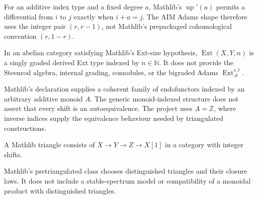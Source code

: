 \begin{definition}
  \label{def:mathlib-complex-shape-up}
  \mathlibok
  For an additive index type and a fixed degree $a$, Mathlib's
  $\operatorname{up}'(a)$ permits a differential from $i$ to $j$ exactly when
  $i+a=j$.  The AIM Adams shape therefore uses the integer pair
  $(r,r-1)$, not Mathlib's prepackaged cohomological convention $(r,1-r)$.
\end{definition}

\begin{definition}
  \label{def:mathlib-derived-ext}
  \mathlibok
  In an abelian category satisfying Mathlib's Ext-size hypothesis,
  $\operatorname{Ext}(X,Y,n)$ is a singly graded derived Ext type indexed by
  $n\in\mathbb N$.  It does not provide the Steenrod algebra, internal grading,
  comodules, or the bigraded Adams $\operatorname{Ext}_{\mathcal A}^{s,t}$.
\end{definition}

\begin{definition}
  \label{def:mathlib-shift}
  \mathlibok
  Mathlib's declaration supplies a coherent family of endofunctors indexed by
  an arbitrary additive monoid $A$.  The generic monoid-indexed structure does
  not assert that every shift is an autoequivalence.  The project uses
  $A=\mathbb Z$, where inverse indices supply the equivalence behaviour needed
  by triangulated constructions.
\end{definition}

\begin{definition}
  \label{def:mathlib-triangle}
  \mathlibok
  A Mathlib triangle consists of $X\to Y\to Z\to X[1]$ in a category with
  integer shifts.
\end{definition}

\begin{definition}
  \label{def:mathlib-pretriangulated}
  \mathlibok
  Mathlib's pretriangulated class chooses distinguished triangles and their
  closure laws.  It does not include a stable-spectrum model or compatibility
  of a monoidal product with distinguished triangles.
\end{definition}

